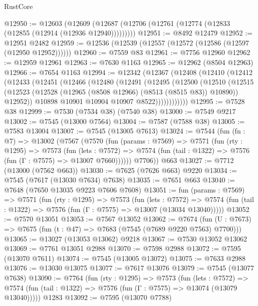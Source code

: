 \begin{lexlean}{RustCore}
\begin{coremodule}
@12950 := @12603
    (@12609 (@12687 (@12706 (@12761 (@12774 (@12833 (@12855 (@12914 (@12936 @12940)))))))))
@12951 := @8492 @12479
@12952 := @12951 @2482
@12959 := @12536 (@12539 (@12557 (@12572 (@12586 (@12597 (@12950 @12952))))))
@12960 := @7559 @83
@12961 := @7756 @12960
@12962 := @12959 @12961
@12963 := @7630 @1163
@12965 := @12962 (@8504 @12963)
@12966 := @7654 @1163
@12994 := @12342
    (@12367
      (@12408
        (@12410
          (@12412
            (@12433
              (@12451
                (@12466
                  (@12480
                    (@12491
                      (@12495
                        (@12500
                          (@12510
                            (@12515
                              (@12523
                                (@12528 (@12965 (@8508 @12966) (@8513 (@8515 @83)) @10890))
                                @12952))
                            @10898
                            @10901
                            @10904
                            @10907
                            @8522))))))))))))
@12995 := @7528 @38
@12999 := @7530 (@7534 @38) (@7540 @38)
@13000 := @7549 @9217
@13002 := @7545 (@13000 @7564)
@13004 := @7587 (@7588 @38)
@13005 := @7583 @13004
@13007 := @7545 (@13005 @7613)
@13024 := @7544
    (fun (fn : @7) =>
    @13002
      (@7567
        (@7570
          (fun (params : @7569) =>
          @7571
            (fun (rty : @1295) =>
            @7573
              (fun (lets : @7572) =>
              @7574 (fun (tail : @1322) => @7576 (fun (Γ : @7575) => @13007 @7660))))))
        @7706))
    @663
@13027 := @7712 (@13000 (@7562 @663))
@13030 := @7625 (@7626 @663) @9220
@13034 := @7545 (@7617 (@13030 @7634) @7638)
@13035 := @7651 @663
@13040 := @7648 (@7650 @13035 @9223 @7606 @7608)
@13051 := fun (params : @7569) =>
  @7571
    (fun (rty : @1295) =>
    @7573
      (fun (lets : @7572) =>
      @7574 (fun (tail : @1322) => @7576 (fun (Γ : @7575) => @13007 (@13034 @13040)))))
@13052 := @7570 @13051
@13053 := @7567 @13052
@13062 := @7674
    (fun (U : @7673) => @7675 (fun (t : @47) => @7683 (@7545 (@7689 @9220 @7563) @7700)))
@13065 := @13027 (@13053 @13062) @9218
@13067 := @7530 @13052 @13062
@13069 := @7761 @13051 @2988
@13070 := @7598 @2988
@13072 := @7595 (@13070 @7611)
@13074 := @7545 (@13005 @13072)
@13075 := @7633 @2988
@13076 := @13030 @13075
@13077 := @7617 @13076
@13079 := @7545 (@13077 @7638)
@13090 := @7764
    (fun (rty : @1295) =>
    @7573
      (fun (lets : @7572) =>
      @7574 (fun (tail : @1322) => @7576 (fun (Γ : @7575) => @13074 (@13079 @13040)))))
    @1283
@13092 := @7595 (@13070 @7788)

\end{coremodule}
\end{lexlean}
